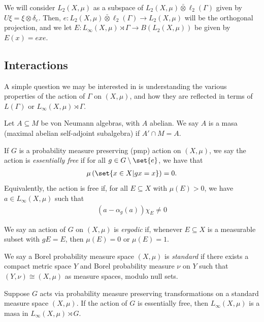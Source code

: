 \documentclass[10pt]{mypackage}
\begin{document}
We will consider $L_{2}\left( X,\mu \right)$ as a subspace of $L_2\left( X,\mu \right)\bar\otimes \ell_2\left( \Gamma \right)$ given by $U\xi = \xi\otimes \delta_e$. Then, $e\colon L_2\left( X,\mu \right)\bar\otimes \ell_2\left( \Gamma \right)\rightarrow L_2\left( X,\mu \right)$ will be the orthogonal projection, and we let $E\colon L_{\infty}\left( X,\mu \right)\rtimes \Gamma\rightarrow B\left( L_2\left( X,\mu \right) \right)$ be given by $E(x) = exe$.
\subsection{Interactions}%
A simple question we may be interested in is understanding the various properties of the action of $\Gamma$ on $\left( X,\mu \right)$, and how they are reflected in terms of $L\left( \Gamma \right)$ or $L_{\infty}\left( X,\mu \right)\rtimes \Gamma$.
\begin{definition}
  Let $A\subseteq M$ be von Neumann algebras, with $A$ abelian. We say $A$ is a masa (maximal abelian self-adjoint subalgebra) if $A'\cap M = A$.
\end{definition}
\begin{definition}
  If $G$ is a probability measure preserving (pmp) action on $\left( X,\mu \right)$, we say the action is \textit{essentially free} if for all $g\in G\setminus \set{e}$, we have that
  \begin{align*}
    \mu\left( \set{x\in X | gx = x} \right) = 0.
  \end{align*}
  Equivalently, the action is free if, for all $E\subseteq X$ with $\mu(E) > 0$, we have $a\in L_{\infty}\left( X,\mu \right)$ such that 
  \begin{align*}
    \left( a-\alpha_g(a) \right)\chi_E \neq 0
  \end{align*}
\end{definition}
\begin{definition}
  We say an action of $G$ on $\left( X,\mu \right)$ is \textit{ergodic} if, whenever $E\subseteq X$ is a measurable subset with $gE = E$, then $\mu(E) = 0$ or $\mu(E) = 1$.
\end{definition}
\begin{definition}
  We say a Borel probability measure space $\left( X,\mu \right)$ is \textit{standard} if there exists a compact metric space $Y$ and Borel probability measure $\nu$ on $Y$ such that $\left( Y,\nu \right)\cong \left( X,\mu \right)$ as measure spaces, modulo null sets.
\end{definition}
\begin{proposition}
  Suppose $G$ acts via probability measure preserving transformations on a standard measure space $\left( X,\mu \right)$. If the action of $G$ is essentially free, then $L_{\infty}\left( X,\mu \right)$ is a masa in $L_{\infty}\left( X,\mu \right)\rtimes G$.
\end{proposition}
\end{document}
